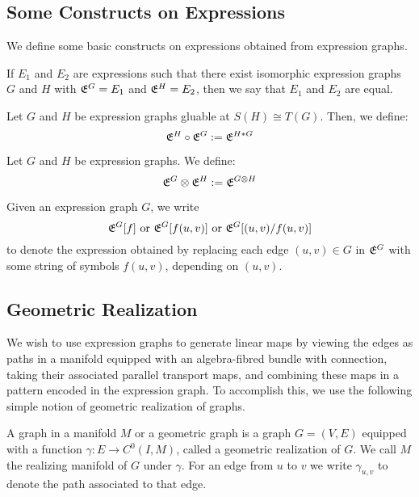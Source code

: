 \documentclass[./Thick_TQFTs_and_Quantum_Information.tex]{subfiles}
\begin{document}

\subsection{Some Constructs on Expressions}

We define some basic constructs on expressions obtained from expression graphs.

\begin{defn}
If $E_1$ and $E_2$ are expressions such that there exist isomorphic
expression graphs $G$ and $H$ with $\mathfrak{E}^{G} = E_1$ and
$\mathfrak{E}^{H} = E_2$, then we say that $E_1$ and $E_2$ are equal.
\end{defn}

\begin{defn}
Let $G$ and $H$ be expression graphs gluable at $S(H) \cong T(G)$. Then, we
define:
\[
  \mathfrak{E}^{H} \circ \mathfrak{E}^{G} := \mathfrak{E}^{H * G}
\]
\end{defn}

\begin{defn}
Let $G$ and $H$ be expression graphs. We define:
\[
  \mathfrak{E}^{G} \otimes \mathfrak{E}^{H} := \mathfrak{E}^{G \otimes H}
\]
\end{defn}

\begin{defn}
Given an expression graph $G$, we write
\[
  \mathfrak{E}^{G}[f] \text{ or } \mathfrak{E}^{G}[f(u, v)] \text{ or } \mathfrak{E}^{G}[(u, v)/f(u, v)]
\]
to denote the expression obtained by replacing each edge $(u, v) \in G$ in
$\mathfrak{E}^{G}$ with some string of symbols $f(u, v)$, depending on $(u, v)$.
\end{defn}

\subsection{Geometric Realization}

We wish to use expression graphs to generate linear maps by viewing the edges as
paths in a manifold equipped with an algebra-fibred bundle with connection,
taking their associated parallel transport maps, and combining these maps in a
pattern encoded in the expression graph. To accomplish this, we use the
following simple notion of geometric realization of graphs.

\begin{defn}
A graph in a manifold $M$ or a geometric graph is a graph $G = (V, E)$ equipped
with a function $\gamma : E \to C^0(I, M)$, called a geometric realization of
$G$. We call $M$ the realizing manifold of $G$ under $\gamma$. For an edge from
$u$ to $v$ we write $\gamma_{u, v}$ to denote the path associated to that edge.
\end{defn}
\end{document}
